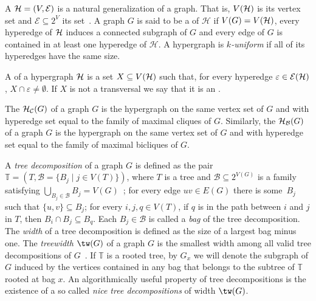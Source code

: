 A  $\mathcal{H} = (V, \mathcal{E})$ is a natural generalization of a graph.
That is, $V(\mathcal{H})$ is its vertex set and $\mathcal{E} \subseteq 2^{V}$ its  set~\citep{hypergraphs}.
A graph $G$ is said to be a  of $\mathcal{H}$ if $V(G) = V(\mathcal{H})$, every hyperedge of $\mathcal{H}$ induces a connected subgraph of $G$ and every edge of $G$ is contained in at least one hyperedge of $\mathcal{H}$.
A hypergraph is \textit{$k$-uniform} if all of its hyperedges have the same size.

A  of a hypergraph $\mathcal{H}$ is a set $X \subseteq V(\mathcal{H})$ such that, for every hyperedge $\varepsilon \in \mathcal{E}(\mathcal{H})$, $X \cap \varepsilon \neq \emptyset$.
If $X$ is not a transversal we say that it is an .

The  $\mathcal{H}_{\mathcal{C}}(G)$ of a graph $G$ is the hypergraph on the same vertex set of $G$ and with hyperedge set equal to the family of maximal cliques of $G$.
Similarly, the  $\mathcal{H}_{\mathcal{B}}(G)$ of a graph $G$ is the hypergraph on the same vertex set of $G$ and with hyperedge set equal to the family of maximal bicliques of $G$.

A \textit{tree decomposition} of a graph $G$ is defined as the pair $\mathbb{T} = \left(T, \mathcal{B} = \{B_j \mid j \in V(T)\}\right)$, where $T$ is a tree and $\mathcal{B} \subseteq 2^{V(G)}$ is a family satisfying $\bigcup_{B_j \in \mathcal{B}} B_j = V(G)$~\citep{treewidth};
for every edge $uv \in E(G)$ there is some~$B_j$ such that $\{u,v\} \subseteq B_j$;
for every $i,j,q \in V(T)$, if $q$ is in the path between $i$ and $j$ in $T$, then $B_i \cap B_j \subseteq B_q$.
Each $B_j \in \mathcal{B}$ is called a \emph{bag} of the tree decomposition.
The \emph{width} of a tree decomposition is defined as the size of a largest bag minus one.
The \emph{treewidth} $\tw(G)$ of a graph $G$ is the smallest width among all valid tree decompositions of $G$~\citep{downey_fellows}.
If $\mathbb{T}$ is a rooted tree, by $G_x$ we will denote the subgraph of $G$ induced by the vertices contained in any bag that belongs to the subtree of $\mathbb{T}$ rooted at bag $x$.
An algorithmically useful property of tree decompositions is the existence of a so called \emph{nice tree decompositions} of width $\tw(G)$.

